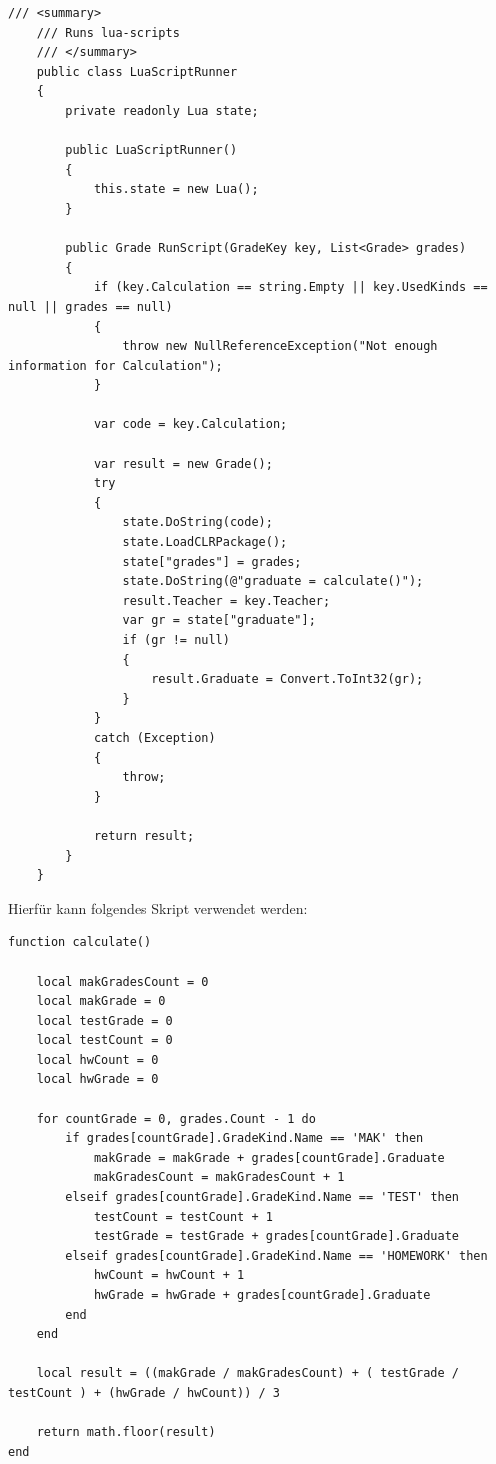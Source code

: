 \begin{lstlisting}[language={[Sharp]C},caption=Code for NLua,label=lst:impl:nlua]
    /// <summary>
    /// Runs lua-scripts
    /// </summary>
    public class LuaScriptRunner
    {
        private readonly Lua state;

        public LuaScriptRunner()
        {
            this.state = new Lua();
        }

        public Grade RunScript(GradeKey key, List<Grade> grades)
        {
            if (key.Calculation == string.Empty || key.UsedKinds == null || grades == null)
            {
                throw new NullReferenceException("Not enough information for Calculation");
            }

            var code = key.Calculation;

            var result = new Grade();
            try
            {
                state.DoString(code);
                state.LoadCLRPackage();
                state["grades"] = grades;
                state.DoString(@"graduate = calculate()");
                result.Teacher = key.Teacher;
                var gr = state["graduate"];
                if (gr != null) 
                {
                    result.Graduate = Convert.ToInt32(gr);
                }
            }
            catch (Exception)
            {
                throw;
            }

            return result;
        }
    }
\end{lstlisting}
\newpage
Hierfür kann folgendes Skript verwendet werden:
\begin{lstlisting}[language={[5.0]Lua},caption=Lua Example,label=lst:impl:luascript]
function calculate()

    local makGradesCount = 0
    local makGrade = 0
    local testGrade = 0
    local testCount = 0
    local hwCount = 0
    local hwGrade = 0

    for countGrade = 0, grades.Count - 1 do 
        if grades[countGrade].GradeKind.Name == 'MAK' then
            makGrade = makGrade + grades[countGrade].Graduate
            makGradesCount = makGradesCount + 1
        elseif grades[countGrade].GradeKind.Name == 'TEST' then
            testCount = testCount + 1
            testGrade = testGrade + grades[countGrade].Graduate
        elseif grades[countGrade].GradeKind.Name == 'HOMEWORK' then
            hwCount = hwCount + 1
            hwGrade = hwGrade + grades[countGrade].Graduate
        end
    end

    local result = ((makGrade / makGradesCount) + ( testGrade / testCount ) + (hwGrade / hwCount)) / 3     

    return math.floor(result)
end
\end{lstlisting}
\newpage
{}

